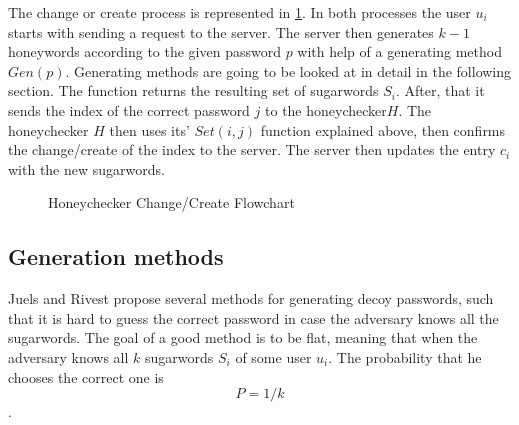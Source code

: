 \documentclass[../main.tex]{subfiles}
\begin{document}
The change or create process is represented in \ref{fig:Figure 2}. In both
processes the user \(u_i\) starts with sending a request to the server. The
server then generates \(k-1\) honeywords according to the given password \(p\)
with help of a generating method \(Gen(p)\). Generating methods are going to be
looked at in detail in the following section. The function returns the resulting
set of sugarwords \(S_i\). After, that it sends the index of the correct
password \(j\) to the honeychecker\(H\). The honeychecker \(H\) then uses its'
\(Set(i,j)\) function explained above, then confirms the change/create of the
index to the server. The server then updates the entry \(c_i\) with the new
sugarwords.

\begin{figure}
  \centering
  \caption{Honeychecker Change/Create Flowchart}
  \label{fig:Figure 2}
\end{figure}

\subsection{Generation methods}

Juels and Rivest propose several methods for generating decoy passwords, such
that it is hard to guess the correct password in case the adversary knows all
the sugarwords. The goal of a good method is to be flat, meaning that when the
adversary knows all \(k\) sugarwords \(S_i\) of some user \(u_i\). The
probability that he chooses the correct one is \[P = 1/k\].  
\end{document}
